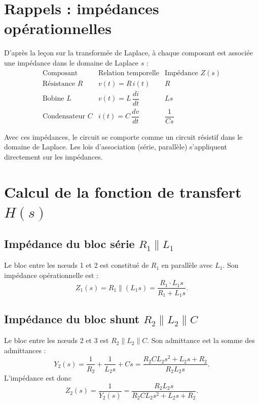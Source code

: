 \documentclass[12pt,a4paper]{article}
\begin{document}
\section{Rappels : impédances opérationnelles}

D'après la leçon sur la transformée de Laplace, à chaque composant est associée une impédance dans le domaine de Laplace \(s\) :
\[
\begin{array}{c|c|c}
\text{Composant} & \text{Relation temporelle} & \text{Impédance } Z(s) \\
\hline
\text{Résistance } R & v(t)=R\,i(t) & R \\
\text{Bobine } L & v(t)=L\,\dfrac{di}{dt} & Ls \\
\text{Condensateur } C & i(t)=C\,\dfrac{dv}{dt} & \dfrac{1}{Cs}
\end{array}
\]

Avec ces impédances, le circuit se comporte comme un circuit résistif dans le domaine de Laplace. Les lois d'association (série, parallèle) s'appliquent directement sur les impédances.

\section{Calcul de la fonction de transfert \(H(s)\)}

\subsection{Impédance du bloc série \(R_1 \parallel L_1\)}
Le bloc entre les nœuds 1 et 2 est constitué de \(R_1\) en parallèle avec \(L_1\). Son impédance opérationnelle est :
\begin{equation}
Z_1(s) = R_1 \parallel (L_1 s) = \frac{R_1 \cdot L_1 s}{R_1 + L_1 s} .
\label{eq:Z1}
\end{equation}

\subsection{Impédance du bloc shunt \(R_2 \parallel L_2 \parallel C\)}
Le bloc entre les nœuds 2 et 3 est \(R_2 \parallel L_2 \parallel C\). Son admittance est la somme des admittances :
\begin{equation}
Y_2(s) = \frac{1}{R_2} + \frac{1}{L_2 s} + C s = \frac{R_2 C L_2 s^2 + L_2 s + R_2}{R_2 L_2 s}.
\end{equation}
L'impédance est donc
\begin{equation}
Z_2(s) = \frac{1}{Y_2(s)} = \frac{R_2 L_2 s}{R_2 C L_2 s^2 + L_2 s + R_2} .
\label{eq:Z2}
\end{equation}
\end{document}
